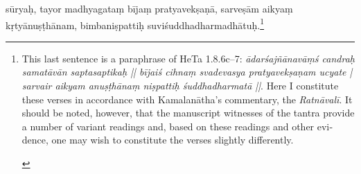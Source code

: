 \documentclass[naipra.tex]{subfiles}
\begin{document}
\begin{sanskrit}
{\begin{english}
	\end{english}
} sūryaḥ, tayor madhyagataṃ bījaṃ pratyavekṣaṇā, sarveṣām aikyaṃ kṛtyānuṣṭhānam, bimbaniṣpattiḥ suviśuddhadharmadhātuḥ.\footnote{
	\begin{english}%
		This last sentence is a paraphrase of HeTa 1.8.6c–7: \emph{ādarśajñānavāṃś candraḥ samatāvān saptasaptikaḥ || bījaiś cihnaṃ svadevasya pratyavekṣaṇam ucyate | sarvair aikyam anuṣṭhānaṃ niṣpattiḥ śuddhadharmatā ||}.
		Here I constitute these verses in accordance with Kamalanātha's commentary, the \emph{Ratnāvalī}.
		It should be noted, however, that the manuscript witnesses of the tantra provide a number of variant readings and, based on these readings and other evidence, one may wish to constitute the verses slightly differently.
	\end{english}
}
\pend





\end{sanskrit}
\end{document}
